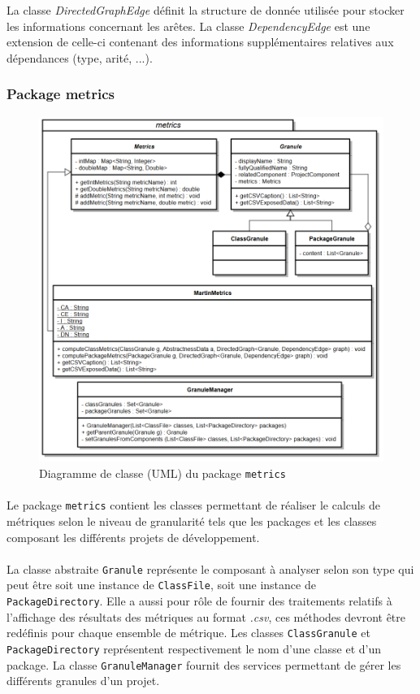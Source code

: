 \documentclass{scrartcl}
\begin{document}
    La classe \emph{DirectedGraphEdge} définit la structure de donnée utilisée pour stocker les informations concernant les arêtes. La classe \emph{DependencyEdge} est une extension de celle-ci contenant des informations supplémentaires relatives aux dépendances (type, arité, ...).

\subsubsection{Package metrics}

    \begin{figure}[h!]
        \centering
        \includegraphics[width=\textwidth]{img/uml/metrics.png}
        \caption{Diagramme de classe (UML) du package \texttt{metrics}}
    \end{figure}
    
    \paragraph{}Le package \texttt{metrics} contient les classes permettant de réaliser le calculs de métriques selon le niveau de granularité tels que les packages et les classes composant les différents projets de développement.
    
    \paragraph{}La classe abstraite \texttt{Granule} représente le composant à analyser selon son type qui peut être soit une instance de \texttt{ClassFile}, soit une instance de \texttt{PackageDirectory}. Elle a aussi pour rôle de fournir des traitements relatifs à l'affichage des résultats des métriques au format \emph{.csv}, ces méthodes devront être redéfinis pour chaque ensemble de métrique. Les classes \texttt{ClassGranule} et \texttt{PackageDirectory} représentent respectivement le nom d'une classe et d'un package.
    La classe \texttt{GranuleManager} fournit des services permettant de gérer les différents granules d'un projet.
    
\end{document}
